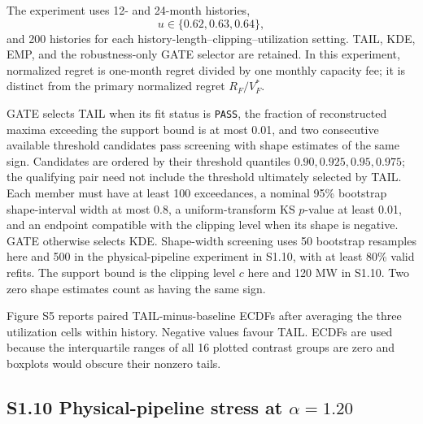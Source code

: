 \documentclass[]{interact}
\begin{document}
The experiment uses 12- and 24-month histories,
\[
u\in\{0.62,0.63,0.64\},
\]
and 200 histories for each
history-length--clipping--utilization setting. TAIL, KDE, EMP, and the
robustness-only GATE selector are retained. In this experiment, normalized regret is one-month regret divided by
one monthly capacity fee;
it is distinct from the primary normalized regret \(R_F/V_F^\ast\).

GATE selects TAIL when its fit status is \texttt{PASS}, the fraction
of reconstructed maxima exceeding the support bound is at most 0.01,
and two consecutive available threshold candidates pass screening
with shape estimates of the same sign. Candidates are ordered by
their threshold quantiles \(0.90,0.925,0.95,0.975\); the qualifying
pair need not include the threshold ultimately selected by TAIL.
Each member must have at least 100 exceedances, a nominal 95\%
bootstrap shape-interval width at most 0.8, a uniform-transform KS
\(p\)-value at least 0.01, and an endpoint compatible with the clipping level when its
shape is negative. GATE otherwise selects KDE.
Shape-width screening uses 50 bootstrap resamples here and 500 in
the physical-pipeline experiment in S1.10, with at least 80\% valid refits.
The support bound is the clipping level \(c\) here and 120 MW in
S1.10. Two zero shape estimates count as having the same sign.

Figure S5 reports paired TAIL-minus-baseline ECDFs after averaging the
three utilization cells within history. Negative values favour TAIL.
ECDFs are used because the interquartile ranges of all 16 plotted
contrast groups are zero and boxplots would obscure their nonzero
tails.

\FloatBarrier




\subsection*{S1.10 Physical-pipeline stress at $\alpha=1.20$}
\end{document}
